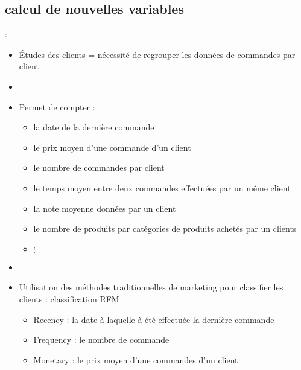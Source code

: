 \documentclass[8pt,aspectratio=169,hyperref={unicode=true}]{beamer}
\begin{document}
\subsection{calcul de nouvelles variables}
\begin{frame}{\insertsection: \insertsubsection}
    \begin{itemize}
        \item Études des clients = nécessité de regrouper les données de commandes par client
        \item[]
        \item Permet de compter :
              \begin{itemize}
                  \item la date de la dernière commande
                  \item le prix moyen d'une commande d'un client
                  \item le nombre de commandes par client
                  \item le temps moyen entre deux commandes effectuées par un même client
                  \item la note moyenne données par un client
                  \item le nombre de produits par catégories de produits achetés par un clients
                  \item[] $\vdots$
              \end{itemize}
        \item[]
        \item Utilisation des méthodes traditionnelles de marketing pour classifier les clients : classification RFM
              \begin{itemize}
                  \item Recency : la date à laquelle à été effectuée la dernière commande
                  \item Frequency : le nombre de commande
                  \item Monetary : le prix moyen d'une commandes d'un client
              \end{itemize}
    \end{itemize}
\end{frame}
\end{document}
